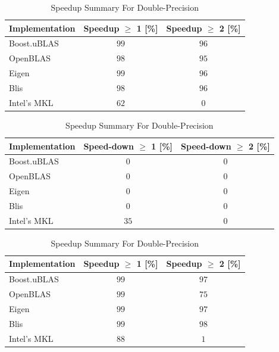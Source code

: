 \begin{table}[ht]
    \centering
    \caption{Speedup Summary For Single-Precision}
    \begin{tabular}{|l|c|c|}
        \hline
        \textbf{Implementation} & \textbf{Speedup $\geq$ 1 [\%]} & \textbf{Speedup $\geq$ 2 [\%]}\\
        \hline
        Boost.uBLAS & $99$ & $96$ \\
        \hline
        OpenBLAS    & $98$ & $95$ \\
        \hline
        Eigen       & $99$ & $96$ \\
        \hline
        Blis        & $98$ & $96$ \\
        \hline
        Intel's MKL & $62$ & $0$ \\
        \hline
    \end{tabular}

    \begin{tabular}{|l|c|c|}
        \hline
        \textbf{Implementation} & \textbf{Speed-down $\geq$ 1 [\%]} & \textbf{Speed-down $\geq$ 2 [\%]}\\
        \hline
        Boost.uBLAS & $0$ & $0$ \\
        \hline
        OpenBLAS    & $0$ & $0$ \\
        \hline
        Eigen       & $0$ & $0$ \\
        \hline
        Blis        & $0$ & $0$ \\
        \hline
        Intel's MKL & $35$ & $0$ \\
        \hline
    \end{tabular}

    \vspace*{1 cm}

    \centering
    \caption{Speedup Summary For Double-Precision}
    \begin{tabular}{|l|c|c|}
        \hline
        \textbf{Implementation} & \textbf{Speedup $\geq$ 1 [\%]} & \textbf{Speedup $\geq$ 2 [\%]}\\
        \hline
        Boost.uBLAS & $99$ & $97$ \\
        \hline
        OpenBLAS    & $99$ & $75$ \\
        \hline
        Eigen       & $99$ & $97$ \\
        \hline
        Blis        & $99$ & $98$ \\
        \hline
        Intel's MKL & $88$ & $1$ \\
        \hline
    \end{tabular}


\end{table}
